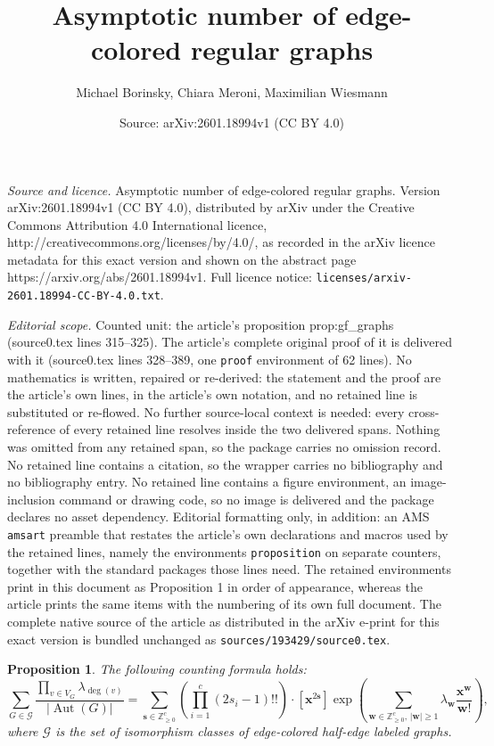 \documentclass[10pt,a4paper]{amsart}
\title{Asymptotic number of edge-colored regular graphs}
\author{Michael Borinsky, Chiara Meroni, Maximilian Wiesmann}
\date{Source: arXiv:2601.18994v1 (CC BY 4.0)}
\newtheorem{proposition}{Proposition}
\DeclareMathOperator{\Aut}{Aut}
\newcommand{\GG}{\mathcal{G}}
\newcommand{\Z}{\mathbb{Z}}
\newcommand{\bb}[1]{\boldsymbol{#1}}
\begin{document}
\maketitle

\noindent\emph{Source and licence.} Asymptotic number of edge-colored regular graphs. Version arXiv:2601.18994v1 (CC BY 4.0), distributed by arXiv under the Creative Commons Attribution 4.0 International licence, http://creativecommons.org/licenses/by/4.0/, as recorded in the arXiv licence metadata for this exact version and shown on the abstract page https://arxiv.org/abs/2601.18994v1. Full licence notice: \texttt{licenses/arxiv-2601.18994-CC-BY-4.0.txt}.\par\smallskip

\noindent\textit{Editorial scope.} Counted unit: the article's proposition prop:gf\_graphs (source0.tex lines 315--325). The article's complete original proof of it is delivered with it (source0.tex lines 328--389, one \texttt{proof} environment of 62 lines). No mathematics is written, repaired or re-derived: the statement and the proof are the article's own lines, in the article's own notation, and no retained line is substituted or re-flowed.  No further source-local context is needed: every cross-reference of every retained line resolves inside the two delivered spans.  Nothing was omitted from any retained span, so the package carries no omission record.  No retained line contains a citation, so the wrapper carries no bibliography and no bibliography entry.  No retained line contains a figure environment, an image-inclusion command or drawing code, so no image is delivered and the package declares no asset dependency.  Editorial formatting only, in addition: an AMS \texttt{amsart} preamble that restates the article's own declarations and macros used by the retained lines, namely the environments \texttt{proposition} on separate counters, together with the standard packages those lines need.  The retained environments print in this document as Proposition 1 in order of appearance, whereas the article prints the same items with the numbering of its own full document.  The complete native source of the article as distributed in the arXiv e-print for this exact version is bundled unchanged as \texttt{sources/193429/source0.tex}.
\begin{proposition}
  \label{prop:gf_graphs}
The following counting formula holds:
  \begin{equation}\label{eq:gf_graphs}
    \sum_{G \in \GG} \frac{\prod_{v\in V_G} \lambda_{\deg(v)}}{|\Aut(G)|} =  
\sum_{\bb{s} \in \Z_{\geq 0}^c} 
\left(\prod_{i=1}^c (2s_i-1)!! \right)
\cdot [\bb{x}^{2\bb{s}}]\exp\left( \sum_{\bb{w}\in \Z^c_{\geq 0},\, |\bb{w}| \geq 1} \lambda_{\bb{w}} \frac{\bb{x}^{\bb{w}}}{\bb{w}!} \right),
  \end{equation}
where $\GG$ is the set of isomorphism classes of edge-colored half-edge labeled graphs. 
\end{proposition}
\end{document}
